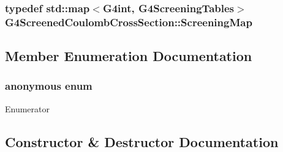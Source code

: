 \subsubsection[{\texorpdfstring{Screening\+Map}{ScreeningMap}}]{\setlength{\rightskip}{0pt plus 5cm}typedef std\+::map$<$G4int, {\bf G4\+Screening\+Tables}$>$ {\bf G4\+Screened\+Coulomb\+Cross\+Section\+::\+Screening\+Map}}\hypertarget{classG4ScreenedCoulombCrossSection_a936cd19a7a45353257f74f1e061de448}{}\label{classG4ScreenedCoulombCrossSection_a936cd19a7a45353257f74f1e061de448}


\subsection{Member Enumeration Documentation}
\subsubsection[{\texorpdfstring{anonymous enum}{anonymous enum}}]{\setlength{\rightskip}{0pt plus 5cm}anonymous enum}\hypertarget{classG4ScreenedCoulombCrossSection_a8d1c04f63ce3f9412b8944b136a43a1b}{}\label{classG4ScreenedCoulombCrossSection_a8d1c04f63ce3f9412b8944b136a43a1b}
\begin{Desc}
\item[Enumerator]\par
\begin{description}
\item[{\em 
n\+Mass\+Map\+Elements\hypertarget{classG4ScreenedCoulombCrossSection_a8d1c04f63ce3f9412b8944b136a43a1baecfd1e5d90fb05d4c6e0a311ed092bfb}{}\label{classG4ScreenedCoulombCrossSection_a8d1c04f63ce3f9412b8944b136a43a1baecfd1e5d90fb05d4c6e0a311ed092bfb}
}]\end{description}
\end{Desc}


\subsection{Constructor \& Destructor Documentation}
